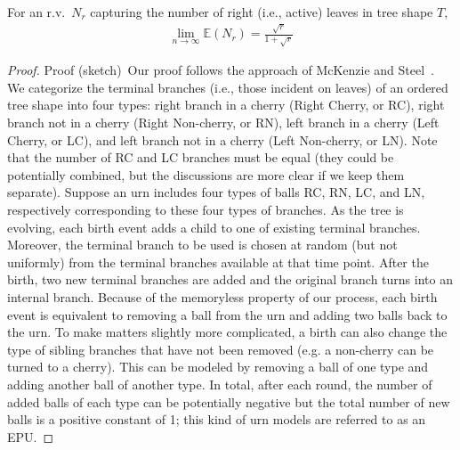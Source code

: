 \begin{corollary}\label{sup:cor:rbh}
For an r.v.\ $N_r$ capturing the number of right (i.e., active) leaves in tree shape $T$,
\begin{align}\label{sup:eq:nr} %
\lim_{n\to\infty}\mathbb{E}(N_r) = \frac{\sqrt{r}}{1+\sqrt{r}}
\end{align}
\end{corollary}

\begin{proof}{Proof (sketch)}\
Our proof follows the approach of McKenzie and Steel~\cite{McKenzie2000}. We categorize the terminal branches (i.e., those incident on leaves) of an ordered tree shape into four types: right branch in a cherry (Right Cherry, or RC), right branch not in a cherry (Right Non-cherry, or RN), left branch in a cherry (Left Cherry, or LC), and left branch not in a cherry (Left Non-cherry, or LN). Note that the number of RC and LC branches must be equal (they could be potentially combined, but the discussions are more clear if we keep them separate). Suppose an urn includes four types of balls RC, RN, LC, and LN, respectively corresponding to these four types of branches. As the tree is evolving, each birth event adds a child to one of existing terminal branches. Moreover, the terminal branch to be used is chosen at random (but not uniformly) from the terminal branches available at that time point. After the birth, two new terminal branches are added and the original branch turns into an internal branch. Because of the memoryless property of our process, each birth event is equivalent to removing a ball from the urn and adding two balls back to the urn. To make matters slightly more complicated, a birth can also change the type of sibling branches that have not been removed (e.g. a non-cherry can be turned to a cherry). This can be modeled by removing a ball of one type and adding another ball of another type. In total, after each round, the number of added balls of each type can be potentially negative but the total number of new balls is a positive constant of 1; this kind of urn models are referred to as an \gls{EPU}.


\end{proof}
